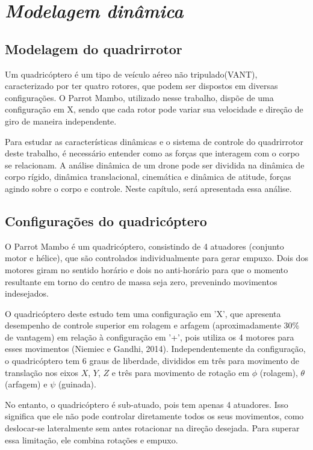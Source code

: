 \chapter{\textit{Modelagem dinâmica}}

\section{Modelagem do quadrirrotor}
Um quadricóptero é um tipo de veículo aéreo não tripulado(VANT), caracterizado por ter quatro rotores, que podem ser dispostos em diversas configurações. O Parrot Mambo, utilizado nesse trabalho, dispõe de uma configuração em X, sendo que cada rotor pode variar sua velocidade e direção de giro de maneira independente.

Para estudar as características dinâmicas e o sistema de controle do quadrirrotor deste trabalho, é necessário entender como as forças que interagem com o corpo se relacionam. A análise dinâmica de um drone pode ser dividida na dinâmica de corpo rígido, dinâmica translacional, cinemática e dinâmica de atitude, forças agindo sobre o corpo e controle. Neste capítulo, será apresentada essa análise.

\section{Configurações do quadricóptero}
O Parrot Mambo é um quadricóptero, consistindo de 4 atuadores (conjunto motor e hélice), que são controlados individualmente para gerar empuxo. Dois dos motores giram no sentido horário e dois no anti-horário para que o momento resultante em torno do centro de massa seja zero, prevenindo movimentos indesejados.

O quadricóptero deste estudo tem uma configuração em 'X', que apresenta desempenho de controle superior em rolagem e arfagem (aproximadamente 30\% de vantagem) em relação à configuração em '+', pois utiliza os 4 motores para esses movimentos (Niemiec e Gandhi, 2014). Independentemente da configuração, o quadricóptero tem 6 graus de liberdade, divididos em três para movimento de translação nos eixos \( X \), \( Y \), \( Z \) e três para movimento de rotação em \( \phi \) (rolagem), \( \theta \) (arfagem) e \( \psi \) (guinada).

No entanto, o quadricóptero é sub-atuado, pois tem apenas 4 atuadores. Isso significa que ele não pode controlar diretamente todos os seus movimentos, como deslocar-se lateralmente sem antes rotacionar na direção desejada. Para superar essa limitação, ele combina rotações e empuxo.

